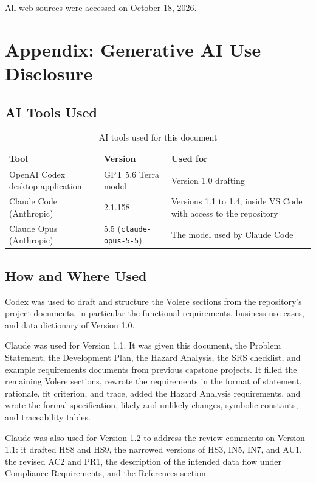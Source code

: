 \documentclass[12pt]{article}
\begin{document}
All web sources were accessed on October 18, 2026.

\newpage{}
\section{Appendix:  Generative AI Use Disclosure}

\subsection{AI Tools Used}
\begin{table}[h!]
\caption{AI tools used for this document} \label{TblAITools}
\begin{tabularx}{\textwidth}{llX}
\toprule
\textbf{Tool} & \textbf{Version} & \textbf{Used for}\\
\midrule
OpenAI Codex desktop application & GPT 5.6 Terra model & Version 1.0
drafting\\
Claude Code (Anthropic) & 2.1.158 & Versions 1.1 to 1.4, inside VS Code with
access to the repository\\
Claude Opus (Anthropic) & 5.5 (\texttt{claude-opus-5-5}) & The model used by
Claude Code\\
\bottomrule
\end{tabularx}
\end{table}

\subsection{How and Where Used}
Codex was used to draft and structure the Volere sections from the
repository's project documents, in particular the functional requirements,
business use cases, and data dictionary of Version 1.0.

Claude was used for Version 1.1. It was given this document, the Problem
Statement, the Development Plan, the Hazard Analysis, the SRS checklist, and
example requirements documents from previous capstone projects. It filled the
remaining Volere sections, rewrote the requirements in the
format of statement, rationale, fit criterion, and trace, added the Hazard Analysis
requirements, and wrote the formal specification, likely and unlikely changes,
symbolic constants, and traceability tables.

Claude was also used for Version 1.2 to address the review comments on
Version 1.1: it drafted HS8 and HS9, the narrowed versions of HS3, IN5, IN7,
and AU1, the revised AC2 and PR1, the description of the intended data flow
under Compliance Requirements, and the References section.
\end{document}

